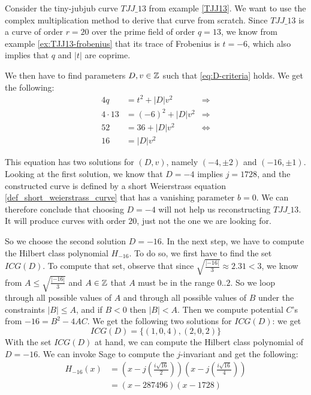 \begin{example} Consider the tiny-jubjub curve $\mathit{TJJ\_13}$ from example \ref{TJJ13}. We want to use the complex multiplication method to derive that curve from scratch. Since $\mathit{TJJ\_13}$ is a curve of order $r=20$ over the prime field of order $q=13$, we know from example \ref{ex:TJJ13-frobenius} that its trace of Frobenius is $t=-6$, which also implies that $q$ and $|t|$ are coprime. 

We then have to find parameters $D,v\in\mathbb{Z}$ such that \ref{eq:D-criteria} holds. We get the following:
\begin{align*}
4q & = t^2+ |D|v^2 & \Rightarrow \\
4\cdot 13 & = (-6)^2+ |D|v^2 & \Rightarrow \\
52 & = 36 + |D|v^2 & \Leftrightarrow \\
16 & = |D|v^2
\end{align*}

This equation has two solutions for $(D,v)$, namely $(-4,\pm 2)$ and $(-16,\pm 1)$. Looking at the first solution, we know that  $D=-4$ implies $j=1728$, and the constructed curve is defined by a short Weierstrass equation \ref{def_short_weierstrass_curve} that has a vanishing parameter $b=0$. We can therefore conclude that choosing $D=-4$ will not help us reconstructing $\mathit{TJJ\_13}$. It will produce curves with order $20$, just not the one we are looking for.

So we choose the second solution $D=-16$. In the next step, we have to compute the Hilbert class polynomial $H_{-16}$. To do so, we first have to find the set $ICG(D)$. To compute that set, observe that since $\sqrt{\frac{|-16|}{3}}\approx 2.31<3$, we know from $A\leq \sqrt{\frac{|-16|}{3}}$ and $A\in\mathbb{Z}$ that $A$ must be in the range $0..2$. So we loop through all possible values of $A$ and through all possible values of $B$ under the constraints $|B|\leq A$, and if $B<0$ then $|B|<A$.
Then we compute potential $C$'s from $-16 = B^2 -4AC$. We get the following two solutions for $ICG(D)$:
we get
$$
ICG(D)=\{(1,0,4),(2,0,2)\}
$$
With the set $ICG(D)$ at hand, we can compute the Hilbert class polynomial of $D=-16$. We can invoke Sage to compute the $j$-invariant and get the following:
\begin{align*}
H_{-16}(x) &= \left(x - j\left(\frac{i\sqrt{16}}{2}\right)\right)
 \left(x - j\left(\frac{i\sqrt{16}}{4}\right)\right) \\
           &= (x- 287496)(x-1728)
\end{align*}


\end{example}
